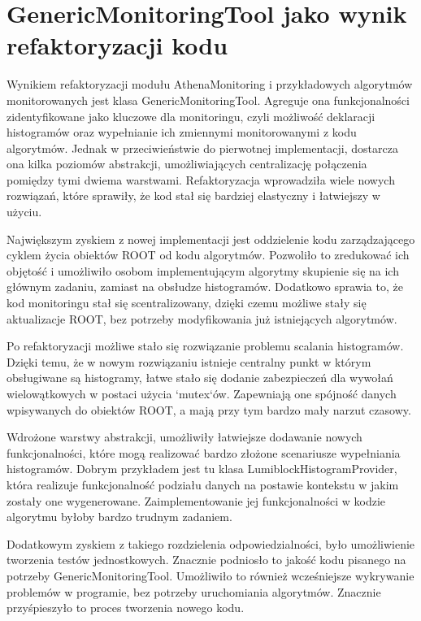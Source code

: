 \section{GenericMonitoringTool jako wynik refaktoryzacji kodu}
Wynikiem refaktoryzacji modułu AthenaMonitoring i przykładowych algorytmów monitorowanych jest klasa GenericMonitoringTool.
Agreguje ona funkcjonalności zidentyfikowane jako kluczowe dla monitoringu, czyli możliwość deklaracji histogramów oraz wypełnianie ich zmiennymi monitorowanymi z kodu algorytmów.
Jednak w przeciwieństwie do pierwotnej implementacji, dostarcza ona kilka poziomów abstrakcji, umożliwiających centralizację połączenia pomiędzy tymi dwiema warstwami.
Refaktoryzacja wprowadziła wiele nowych rozwiązań, które sprawiły, że kod stał się bardziej elastyczny i łatwiejszy w użyciu.

Największym zyskiem z nowej implementacji jest oddzielenie kodu zarządzającego cyklem życia obiektów ROOT od kodu algorytmów. 
Pozwoliło to zredukować ich objętość i umożliwiło osobom implementującym algorytmy skupienie się na ich głównym zadaniu, zamiast na obsłudze histogramów.
Dodatkowo sprawia to, że kod monitoringu stał się scentralizowany, dzięki czemu możliwe stały się aktualizacje ROOT, bez potrzeby modyfikowania już istniejących algorytmów.

Po refaktoryzacji możliwe stało się rozwiązanie problemu scalania histogramów.
Dzięki temu, że w nowym rozwiązaniu istnieje centralny punkt w którym obsługiwane są histogramy, łatwe stało się dodanie zabezpieczeń dla wywołań wielowątkowych w postaci użycia `mutex`ów.
Zapewniają one spójność danych wpisywanych do obiektów ROOT, a mają przy tym bardzo mały narzut czasowy.

Wdrożone warstwy abstrakcji, umożliwiły łatwiejsze dodawanie nowych funkcjonalności, które mogą realizować bardzo złożone scenariusze wypełniania histogramów.
Dobrym przykładem jest tu klasa LumiblockHistogramProvider, która realizuje funkcjonalność podziału danych na postawie kontekstu w jakim zostały one wygenerowane. 
Zaimplementowanie jej funkcjonalności w kodzie algorytmu byłoby bardzo trudnym zadaniem. 

Dodatkowym zyskiem z takiego rozdzielenia odpowiedzialności, było umożliwienie tworzenia testów jednostkowych. 
Znacznie podniosło to jakość kodu pisanego na potrzeby GenericMonitoringTool.
Umożliwiło to również wcześniejsze wykrywanie problemów w programie, bez potrzeby uruchomiania algorytmów. 
Znacznie przyśpieszyło to proces tworzenia nowego kodu.

